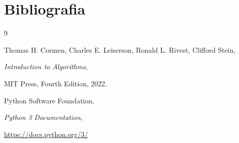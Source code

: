 \documentclass[a4paper,12pt]{article}
\begin{document}
\clearpage

\section{Bibliografia}

\begin{thebibliography}{9}


Thomas H. Cormen, Charles E. Leiserson, Ronald L. Rivest, Clifford Stein,

\textit{Introduction to Algorithms},

MIT Press, Fourth Edition, 2022.


Python Software Foundation,

\textit{Python 3 Documentation},

\url{https://docs.python.org/3/}

\end{thebibliography}
\end{document}
